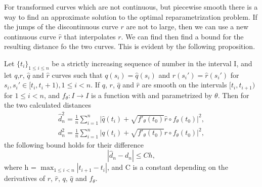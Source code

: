 For transformed curves which are not continuous, but piecewise smooth there is a way to find an approximate solution to the optimal reparametrization problem. If the jumps of the discontinuous curve \(r\) are not to large, then we can use a new continuous curve \(\hat r\) that interpolates \(r\). We can find then find a bound for the resulting distance fo the two curves. This is evident by the following proposition.
\begin{proposition}
  Let \(\{t_i\}_{1 \leq i\leq n}\) be a strictly increasing sequence of number in the interval I, and let \(q\),\(r\), \(\hat q\) and  \(\hat r\) curves such that \(q(s_i)=\hat q(s_i)\) and \(r(s_i')=\hat r(s_i')\) for \(s_i, s_i' \in [t_i, t_i+1), 1\leq i < n\). If  \(q\),  \(r\),   \(\hat q\) and  \(\hat r\) are smooth on the intervals  \([t_i, t_{i+1})\) for  \( 1 \leq i <n\), and  \(f_\theta : I \rightarrow I\) is a function with  and parametrized by \( \theta \). Then for the two calculated distances
  \begin{eqnarray}
    \hat d_n^2=\frac{1}{n}\sum_{i=1}^{n}\Big|\hat q(t_i) + \sqrt{f'_{\theta}(t_0)} \hat r \circ f_{\theta}(t_0)\Big|^2, \\
    d_n^2=\frac{1}{n}\sum_{i=1}^{n}\Big|q(t_i) + \sqrt{f'_{\theta}(t_0)} r \circ f_{\theta}(t_0)\Big|^2,
  \end{eqnarray}
  the following bound holds for their difference
  \begin{equation}
    | \hat d_n -d_n | \leq  C h,
  \end{equation}
  where h = \(\max_{1\leq i<n}|t_{i+1} - t_{i} |\), and C is a constant depending on the derivatives of  \(r\),  \(\hat{r}\),  \(q\),  \(\hat q\) and  \(f_{\theta}\).
\end{proposition}
